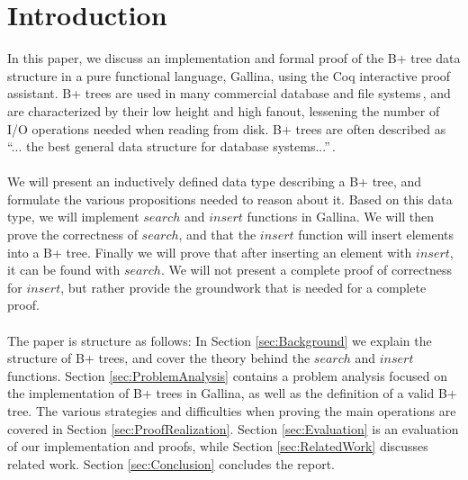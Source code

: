 \section{Introduction}
\label{sec:Introduction}
In this paper, we discuss an implementation and formal proof of the B+ tree data structure in a pure functional language, Gallina, using the Coq interactive proof assistant. B+ trees are used in many commercial database and file systems\,\cite[p. 359]{ramakrishnan2003database}, and are characterized by their low height and high fanout, lessening the number of I/O operations needed when reading from disk. B+ trees are often described as ``... the best general data structure for database systems...''\,\cite[p. 84]{shasha2002database}.
\paragraph{}
We will present an inductively defined data type describing a B+ tree, and formulate the various propositions needed to reason about it. Based on this data type, we will implement $search$ and $insert$ functions in Gallina. We will then prove the correctness of $search$, and that the $insert$ function will insert elements into a B+ tree. Finally we will prove that after inserting an element with $insert$, it can be found with $search$. We will not present a complete proof of correctness for $insert$, but rather provide the groundwork that is needed for a complete proof.
\paragraph{}
The paper is structure as follows: In Section \ref{sec:Background} we explain the structure of B+ trees, and cover the theory behind the $search$ and $insert$ functions. Section \ref{sec:ProblemAnalysis} contains a problem analysis focused on the implementation of B+ trees in Gallina, as well as the definition of a valid B+ tree. The various strategies and difficulties when proving the main operations are covered in Section \ref{sec:ProofRealization}. Section \ref{sec:Evaluation} is an evaluation of our implementation and proofs, while Section \ref{sec:RelatedWork} discusses related work. Section \ref{sec:Conclusion} concludes the report.
